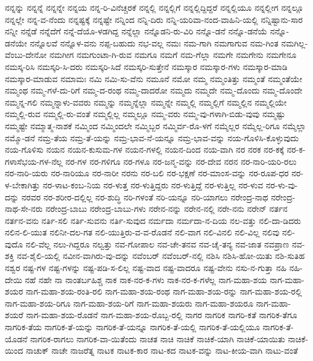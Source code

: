 {ನನ್ನನ್ನು
ನನ್ನನ್ನೆ
ನನ್ನನ್ನೇ
ನನ್ನಯ
ನನ್ನ-ರಿ-ವಿನೆಚ್ಚರಕೆ
ನನ್ನಲ್ಲಿ
ನನ್ನಲ್ಲಿಗೆ
ನನ್ನಲ್ಲಿದ್ದಿದ್ದರೆ
ನನ್ನಲ್ಲಿಯೂ
ನನ್ನಲ್ಲೀಗ
ನನ್ನಲ್ಲೂ
ನನ್ನಲ್ಲೇ
ನನ್ನ-ವ-ನೆಂದು
ನನ್ನಷ್ಟಕ್ಕೆ
ನನ್ನಷ್ಟೇ
ನನ್ನಿಂದ
ನನ್ನಿ-ದಿರು
ನನ್ನಿ-ಯರಿವಾ-ನಂದ-ವಾಹಿನಿ-ಯಲ್ಲಿ
ನನ್ನಿಷ್ಟಾನು-ಸಾರ
ನನ್ನೀ
ನನ್ನೆಡೆ
ನನ್ನೆದೆಗೆ
ನನ್ನೆ-ದೆಯೊ-ಳಡಗಿದ್ದ
ನನ್ನೆಲ್ಲಾ
ನನ್ನೊಡನಿ-ರು-ವಿರಿ
ನನ್ನೊ-ಡನೆ
ನನ್ನೊ-ಡನೆಯೆ
ನನ್ನೊ-ಡನೆಯೇ
ನನ್ನೊಲವೆ
ನನ್ನೊಳ-ವನು
ನಪ್ಪ-ಬಹುದು
ನಭ-ವಲ್ಲ
ನಮಃ
ನಮ-ಗಾಗಿ
ನಮಗಾಗುವ
ನಮ-ಗಿಂತ
ನಮಗಿಲ್ಲ-ವೆಂಬು-ದೇನೋ
ನಮಗೀಗ
ನಮಗುಂಟಾ-ಗಿ-ರುವ
ನಮಗೂ
ನಮಗೆ
ನಮ-ಗೆಲ್ಲಾ
ನಮಗೇ
ನಮಗೇನು
ನಮಗೇನೂ
ನಮಸ್ಕ-ರಿಸಿ
ನಮಸ್ಕರಿ-ಸಿ-ದರು
ನಮಸ್ಕರಿ-ಸಿದೆ
ನಮಸ್ಕರಿ-ಸುತ್ತೇನೆ
ನಮಸ್ಕಾರ
ನಮಸ್ಕಾರ-ಗಳು
ನಮಸ್ಕಾರ-ಮಾಡಿ
ನಮಸ್ಕಾರ-ಮಾಡುವ
ನಮಾಮಃ
ನಮಿ
ನಮಿ-ಸು-ವೆನು
ನಮೂನೆ
ನಮೋ
ನಮ್ಮ
ನಮ್ಮಂತಿತ್ತು
ನಮ್ಮಂತೆ
ನಮ್ಮಂತೆಯೇ
ನಮ್ಮಂಥ
ನಮ್ಮ-ಗಳೆ-ದು-ರಿಗೆ
ನಮ್ಮ-ದ-ರಂಥ
ನಮ್ಮ-ದಾದರೋ
ನಮ್ಮದು
ನಮ್ಮದೇ
ನಮ್ಮ-ದೊಂದು
ನಮ್ಮ-ದೊಂದೇ
ನಮ್ಮನ್ನ-ಗಲಿ
ನಮ್ಮನ್ನಾಳು-ವವರು
ನಮ್ಮನ್ನು
ನಮ್ಮನ್ನೆಲ್ಲಾ
ನಮ್ಮನ್ನೇ
ನಮ್ಮಲ್ಲಿ
ನಮ್ಮಲ್ಲಿಗೆ
ನಮ್ಮಲ್ಲಿನ
ನಮ್ಮಲ್ಲಿಯೇ
ನಮ್ಮಲ್ಲಿ-ರುವ
ನಮ್ಮಲ್ಲಿ-ರು-ವಂತೆ
ನಮ್ಮಲ್ಲಿಲ್ಲ
ನಮ್ಮಲ್ಲೂ
ನಮ್ಮ-ವರು
ನಮ್ಮ-ವು-ಗಳಾಗಿ-ಬಿಡು-ವುವು
ನಮ್ಮಷ್ಟು
ನಮ್ಮಷ್ಟೇ
ನಮ್ಮಾತ್ಮ-ನಾಶಕೆ
ನಮ್ಮಿಂದ
ನಮ್ಮಿಂದಲೇ
ನಮ್ಮಿಬ್ಬರ
ನಮ್ಮಿರ್ವ-ರೊ-ಳಗೆ
ನಮ್ಮೆಲ್ಲರ
ನಮ್ಮೆಲ್ಲ-ರಿಗೂ
ನಮ್ಮೆಲ್ಲಾ
ನಮ್ಮೊ-ಡನೆ
ನಮ್ರ-ತೆಯ
ನಮ್ರ-ತೆ-ಯನ್ನು
ನಮ್ರ-ಭಾವ-ನೆ-ಯನ್ನೂ
ನಮ್ರ-ಭಾವ-ವನ್ನು
ನಯ-ಗೊಳಿಸಿ-ಕೊಳ್ಳುವುದು
ನಯ-ಗೊಳಿಸು
ನಯನ
ನಯನ-ಕುಸುಮ-ಗಳ
ನಯನ-ಗಳಲ್ಲಿ
ನಯನ-ದಿಂದ
ನಯ-ವಾಗಿ
ನರ
ನರಕ
ನರ-ಕಕ್ಕೆ
ನರ-ಕ-ಗಳಾಸೆಭಯ-ಗಳ-ನೆಲ್ಲ
ನರ-ಗಳ
ನರ-ಗಳಿಗೂ
ನರ-ಗಳೂ
ನರ-ಜನ್ಮ-ವನ್ನು
ನರ-ದೇವ
ನರನ
ನರ-ನಾರಿ-ಯರಿ-ರಲು
ನರ-ನಾರಿ-ಯರು
ನರ-ನಾರಿಯೂ
ನರ-ನಾರೀ
ನರನು
ನರ-ಬಲಿ
ನರ-ಭಕ್ಷಣೆ
ನರ-ಮಾಂಸ-ವನ್ನು
ನರ-ರೂಪ-ಧರ
ನರ-ಳ-ಬೇಕಾಗಿತ್ತು
ನರ-ಳಾಟ-ಕಂಬ-ನಿಯ
ನರ-ಳುತ್ತ
ನರ-ಳುತ್ತಿದ್ದರು
ನರ-ಳುತ್ತಿದ್ದೆ
ನರ-ಳುತ್ತಿಲ್ಲ
ನರ-ಳುವ
ನರ-ಳು-ವು-ದನ್ನು
ನರವರ
ನರ-ಶರೀರ-ದಲ್ಲಿಲ್ಲ
ನರ-ಶುದ್ಧಿ
ನರಿ-ಗಳಂತೆ
ನರಿ-ಯನ್ನೂ
ನರಿ-ಯಾಗಲು
ನರೇಂದ್ರ-ನಾಥ
ನರೇಂದ್ರ-ನಾಥ-ಸೇ-ನರು
ನರೇಂದ್ರ-ಬಾಬು
ನರೇಂದ್ರ-ಬಾಬು-ಗಳು
ನರೇನ-ನನ್ನು
ನರೇನ-ನಲ್ಲಿ
ನರೇ-ನನು
ನರೇನ್
ನರ್ತನ
ನರ್ತನ-ವನು
ನರ್ತಿ-ಸಲಿ
ನರ್ತಿ-ಸುವನು
ನರ್ತಿ-ಸುವುದ
ನರ್ಮದಾ
ನರ್ಮದಾ-ನ-ದಿಯ
ನಲ-ವತ್ತು
ನಲಿ-ದಾ-ಡಿದರು
ನಲಿನ-ಲಿ-ಯುತ
ನಲಿನೀ-ದಲ-ಗತ
ನಲಿ-ಯುತ್ತಿರು-ವ-ವ-ರೊಡನೆ
ನಲಿ-ವಾಗ
ನಲಿ-ವಿನಲಿ
ನಲಿ-ವಿಲ್ಲ
ನಲಿವು
ನಲಿ-ವುದೊ
ನಲಿ-ವೆಲ್ಲ
ನಲು-ಗಿದ್ದರೂ
ನಲ್ವತ್ತು
ನವ-ಗೋಪಾಲ
ನವ-ಚೇ-ತನವ
ನವ-ಚೈ-ತನ್ಯ
ನವ-ಜಾತ
ನವಪ್ರಾಣ
ನವ-ಶಕ್ತಿ
ನವ-ಶೈಲಿ-ಯಲ್ಲಿ
ನವೀನ-ವಾಗಿರು-ವು-ದನ್ನು
ನವೆಂಬರ್
ನವೆಂಬರ್-ನಲ್ಲಿ
ನಶಿಸಿ
ನಶಿಸಿ-ಹೋ-ಯಿತು
ನಶಿ-ಸುತಿಹ
ನಶ್ವರ
ನಷ್ಟ-ಗಳ
ನಷ್ಟ-ಗಳನ್ನು
ನಷ್ಟ-ಪಡಿ-ಸ-ಲಿಲ್ಲ
ನಷ್ಟ-ವಾದ
ನಷ್ಟ-ವಾದರೂ
ನಷ್ಟ-ವೇನು
ನಸು-ನ-ಗುತ್ತಾ
ನಹಿ
ನಹಿ-ದೇಯಿ
ನಹೆ
ನಹೇ
ನಾ
ನಾಂತರ್ಬಹಿಶ್ಚ
ನಾಕ
ನಾಕ-ನರ-ಕ-ಗಳು
ನಾಕ-ನರ-ಕ-ಗಳೆಲ್ಲ
ನಾಗ-ಮಹಾ-ಶಯ
ನಾಗ-ಮಹಾ-ಶಯರ
ನಾಗ-ಮಹಾ-ಶಯ-ರಂತಿ-ರಲಿ
ನಾಗ-ಮಹಾ-ಶಯ-ರಂಥ
ನಾಗ-ಮಹಾ-ಶಯ-ರನ್ನು
ನಾಗ-ಮಹಾ-ಶಯ-ರಲ್ಲಿ
ನಾಗ-ಮಹಾ-ಶಯ-ರಿಗೂ
ನಾಗ-ಮಹಾ-ಶಯ-ರಿಗೆ
ನಾಗ-ಮಹಾ-ಶಯರು
ನಾಗ-ಮಹಾ-ಶಯರೂ
ನಾಗ-ಮಹಾ-ಶಯರೆ
ನಾಗ-ಮಹಾ-ಶಯ-ರೊಡನೆ
ನಾಗ-ಮಹಾ-ಶಯ-ರೊಬ್ಬ-ರಲ್ಲಿ
ನಾಗರ
ನಾಗರಿಕ
ನಾಗರಿ-ಕತೆ
ನಾಗರಿಕ-ತೆಗೂ
ನಾಗರಿಕ-ತೆಯ
ನಾಗರಿಕ-ತೆ-ಯನ್ನು
ನಾಗರಿಕ-ತೆ-ಯನ್ನೂ
ನಾಗರಿಕ-ತೆ-ಯಲ್ಲಿ
ನಾಗರಿಕ-ತೆ-ಯಲ್ಲಿಯೂ
ನಾಗರಿಕ-ತೆ-ಯೊಡನೆ
ನಾಗರಿಕ-ರಾಗಲು
ನಾಗರಿಕ-ವಾ-ಯಿತೆಂದು
ನಾಚತ
ನಾಚಿ
ನಾಚಿಕೆ
ನಾಚಿಕೆ-ಯಾಗಿ
ನಾಚಿಕೆ-ಯಾಯಿತು
ನಾಚಿಕೆ-ಯಿಂದ
ನಾಚುಕ್
ನಾಚೇ
ನಾಜರೆತ್ನ
ನಾಟಕ
ನಾಟಕ-ಕಾರ
ನಾಟ-ಕದ
ನಾಟಕ-ವನ್ನು
ನಾಟ-ಕೀಯ-ವಾಗಿ
ನಾಟು-ವಂತೆ
}
